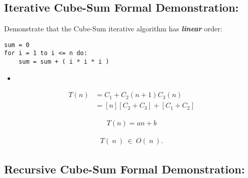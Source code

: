 \documentclass[10pt,a4paper]{article}
\begin{document}
\pagebreak

\subsection{Iterative Cube-Sum Formal Demonstration:}

Demonstrate that the Cube-Sum iterative algorithm has {\bfseries\itshape linear} order: \hfill \break

\begin{lstlisting}
sum = 0
for i = 1 to i <= n do:
	sum = sum + ( i * i * i )
\end{lstlisting}

\begin{itemize}
\item {\bfseries\itshape\color{Maroon}{Demonstration:}} \hfill
\end{itemize}

\begin{ceqn}
\begin{align}
T( n ) &= C_{1} + C_{2}( n + 1 ) C_{3}( n ) \\
&= [ n ] [ C_{2} + C_{3} ] + [ C_{1} + C_{2} ] 
\end{align}
\end{ceqn}

{\bfseries\itshape{}} \hfill

{\bfseries\itshape\color{CadetBlue}{Then:}}

\begin{ceqn}
\begin{align}
T( n ) = an + b
\end{align}
\end{ceqn} \hfill

{\bfseries\itshape\color{CadetBlue}{Finally:}}

\begin{ceqn}
\begin{align}
T(\ n\ )\ \in\ O(\ n\  ).
\end{align}
\end{ceqn}

\pagebreak

\subsection{Recursive Cube-Sum Formal Demonstration:}
\end{document}
